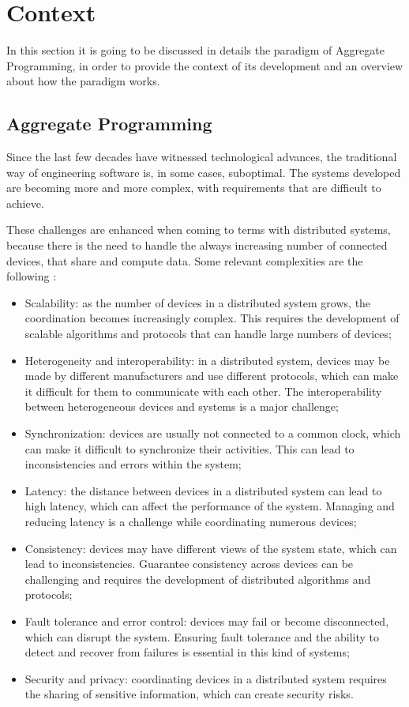 \section{Context}
In this section it is going to be discussed in details the paradigm of Aggregate Programming, in order to provide the context of its development and an overview about how the paradigm works.

\subsection{Aggregate Programming}
Since the last few decades have witnessed technological advances, the traditional way of engineering software is, in some cases, suboptimal.
The systems developed are becoming more and more complex, with requirements that are difficult to achieve. 

These challenges are enhanced when coming to terms with distributed systems, because there is the need to handle the always increasing number of connected devices, that share and compute data.\newline
Some relevant complexities are the following \cite{distributed_systems_challenges}:
\begin{itemize}
    \item Scalability: as the number of devices in a distributed system grows, the coordination becomes increasingly complex. This requires the development of scalable algorithms and protocols that can handle large numbers of devices;
    \item Heterogeneity and interoperability: in a distributed system, devices may be made by different manufacturers and use different protocols, which can make it difficult for them to communicate with each other. The interoperability between heterogeneous devices and systems is a major challenge;
    \item Synchronization: devices are usually not connected to a common clock, which can make it difficult to synchronize their activities. This can lead to inconsistencies and errors within the system;
    \item Latency: the distance between devices in a distributed system can lead to high latency, which can affect the performance of the system. Managing and reducing latency is a challenge while coordinating numerous devices;
    \item Consistency: devices may have different views of the system state, which can lead to inconsistencies. Guarantee consistency across devices can be challenging and requires the development of distributed algorithms and protocols;
    \item Fault tolerance and error control: devices may fail or become disconnected, which can disrupt the system. Ensuring fault tolerance and the ability to detect and recover from failures is essential in this kind of systems;
    \item Security and privacy: coordinating devices in a distributed system requires the sharing of sensitive information, which can create security risks.
\end{itemize}


